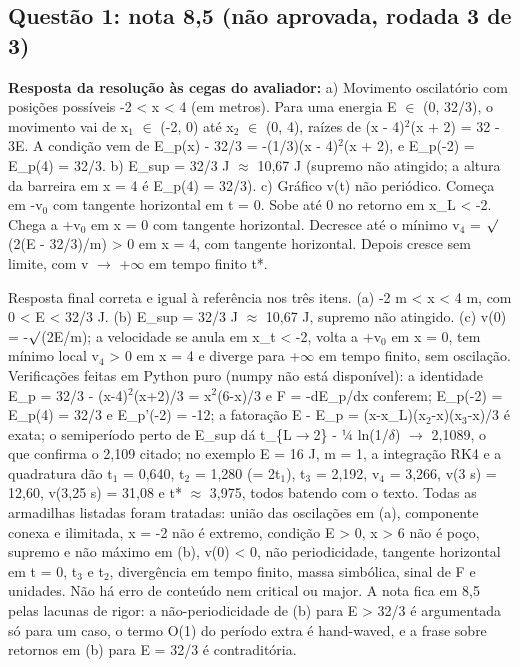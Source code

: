 \documentclass{article}%
\begin{document}
\subsection*{Questão 1: nota 8,5 (não aprovada, rodada 3 de 3)}%
\textbf{Resposta da resolução às cegas do avaliador:} a) Movimento oscilatório com posições possíveis -2 < x < 4 (em metros). Para uma energia E $\in$ (0, 32/3), o movimento vai de x$_{1}$ $\in$ (-2, 0) até x$_{2}$ $\in$ (0, 4), raízes de (x - 4)$^2$(x + 2) = 32 - 3E. A condição vem de E\_p(x) - 32/3 = -(1/3)(x - 4)$^2$(x + 2), e E\_p(-2) = E\_p(4) = 32/3.\newline%
\newline%
b) E\_sup = 32/3 J $\approx$ 10,67 J (supremo não atingido; a altura da barreira em x = 4 é E\_p(4) = 32/3).\newline%
\newline%
c) Gráfico v(t) não periódico. Começa em -v$_{0}$ com tangente horizontal em t = 0. Sobe até 0 no retorno em x\_L < -2. Chega a +v$_{0}$ em x = 0 com tangente horizontal. Decresce até o mínimo v$_{4}$ = $\surd$(2(E - 32/3)/m) > 0 em x = 4, com tangente horizontal. Depois cresce sem limite, com v $\to$ +$\infty$ em tempo finito t*.\par %
Resposta final correta e igual à referência nos três itens. (a) -2 m < x < 4 m, com 0 < E < 32/3 J. (b) E\_sup = 32/3 J $\approx$ 10,67 J, supremo não atingido. (c) v(0) = -$\surd$(2E/m); a velocidade se anula em x\_t < -2, volta a +v$_{0}$ em x = 0, tem mínimo local v$_{4}$ > 0 em x = 4 e diverge para +$\infty$ em tempo finito, sem oscilação.\newline%
\newline%
Verificações feitas em Python puro (numpy não está disponível): a identidade E\_p = 32/3 - (x-4)$^2$(x+2)/3 = x$^2$(6-x)/3 e F = -dE\_p/dx conferem; E\_p(-2) = E\_p(4) = 32/3 e E\_p'(-2) = -12; a fatoração E - E\_p = (x-x\_L)(x$_{2}$-x)(x$_{3}$-x)/3 é exata; o semiperíodo perto de E\_sup dá t\_\{L$\to$2\} - ¼ ln(1/$\delta$) $\to$ 2,1089, o que confirma o 2,109 citado; no exemplo E = 16 J, m = 1, a integração RK4 e a quadratura dão t$_{1}$ = 0,640, t$_{2}$ = 1,280 (= 2t$_{1}$), t$_{3}$ = 2,192, v$_{4}$ = 3,266, v(3 s) = 12,60, v(3,25 s) = 31,08 e t* $\approx$ 3,975, todos batendo com o texto.\newline%
\newline%
Todas as armadilhas listadas foram tratadas: união das oscilações em (a), componente conexa e ilimitada, x = -2 não é extremo, condição E > 0, x > 6 não é poço, supremo e não máximo em (b), v(0) < 0, não periodicidade, tangente horizontal em t = 0, t$_{3}$ e t$_{2}$, divergência em tempo finito, massa simbólica, sinal de F e unidades. Não há erro de conteúdo nem critical ou major. A nota fica em 8,5 pelas lacunas de rigor: a não{-}periodicidade de (b) para E > 32/3 é argumentada só para um caso, o termo O(1) do período extra é hand{-}waved, e a frase sobre retornos em (b) para E = 32/3 é contraditória.%
\end{document}
